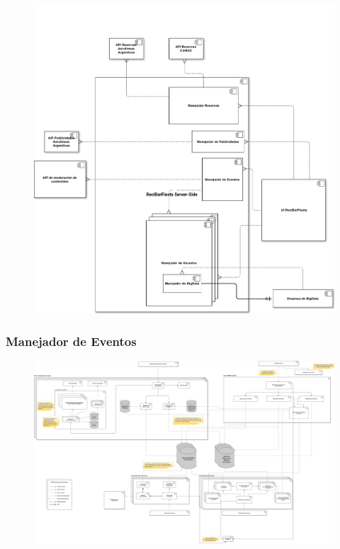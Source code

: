 \begin{figure}[H]
  \centering
  \includegraphics[width=\textwidth]{diagramas/ReciBarFiesta.png}
  \caption{\normalfont }
\end{figure} 

\subsubsection{Manejador de Eventos}

\begin{figure}[H]
  \centering
  \includegraphics[width=\textwidth]{diagramas/ManejadorDeEventos.png}
  \caption{\normalfont }
\end{figure} 

